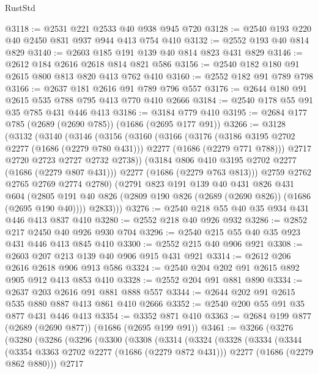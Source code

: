 \begin{lexlean}{RustStd}
\begin{coremodule}
@3118 := @2531 @221 @2533 @40 @938 @945 @720
@3128 := @2540 @193 @220 @40 @2450 @831 @937 @944 @413 @754 @410
@3132 := @2552 @193 @40 @814 @829
@3140 := @2603 @185 @191 @139 @40 @814 @823 @431 @829
@3146 := @2612 @184 @2616 @2618 @814 @821 @586
@3156 := @2540 @182 @180 @91 @2615 @800 @813 @820 @413 @762 @410
@3160 := @2552 @182 @91 @789 @798
@3166 := @2637 @181 @2616 @91 @789 @796 @557
@3176 := @2644 @180 @91 @2615 @535 @788 @795 @413 @770 @410 @2666
@3184 := @2540 @178 @55 @91 @35 @785 @431 @446 @413
@3186 := @3184 @779 @410
@3195 := @2684 @177 @785 (@2689 (@2690 @785)) (@1686 (@2695 @177 @91))
@3266 := @3128
    (@3132
      (@3140
        (@3146
          (@3156
            (@3160
              (@3166
                (@3176
                  (@3186 @3195 @2702 @2277 (@1686 (@2279 @780 @431)))
                  @2277
                  (@1686 (@2279 @771 @788)))
                @2717
                @2720
                @2723
                @2727
                @2732
                @2738))
            (@3184 @806 @410 @3195 @2702 @2277 (@1686 (@2279 @807 @431)))
            @2277
            (@1686 (@2279 @763 @813)))
          @2759
          @2762
          @2765
          @2769
          @2774
          @2780)
        (@2791
          @823
          @191
          @139
          @40
          @431
          @826
          @431
          @604
          (@2805 @191 @40 @826 (@2809 @190 @826 (@2689 (@2690 @826)) (@1686 (@2695 @190 @40))))
          @2833)))
@3276 := @2540 @218 @55 @40 @35 @934 @431 @446 @413 @837 @410
@3280 := @2552 @218 @40 @926 @932
@3286 := @2852 @217 @2450 @40 @926 @930 @704
@3296 := @2540 @215 @55 @40 @35 @923 @431 @446 @413 @845 @410
@3300 := @2552 @215 @40 @906 @921
@3308 := @2603 @207 @213 @139 @40 @906 @915 @431 @921
@3314 := @2612 @206 @2616 @2618 @906 @913 @586
@3324 := @2540 @204 @202 @91 @2615 @892 @905 @912 @413 @853 @410
@3328 := @2552 @204 @91 @881 @890
@3334 := @2637 @203 @2616 @91 @881 @888 @557
@3344 := @2644 @202 @91 @2615 @535 @880 @887 @413 @861 @410 @2666
@3352 := @2540 @200 @55 @91 @35 @877 @431 @446 @413
@3354 := @3352 @871 @410
@3363 := @2684 @199 @877 (@2689 (@2690 @877)) (@1686 (@2695 @199 @91))
@3461 := @3266
    (@3276
      (@3280
        (@3286
          (@3296
            (@3300
              (@3308
                (@3314
                  (@3324
                    (@3328
                      (@3334
                        (@3344
                          (@3354 @3363 @2702 @2277 (@1686 (@2279 @872 @431)))
                          @2277
                          (@1686 (@2279 @862 @880)))
                        @2717

\end{coremodule}
\end{lexlean}
